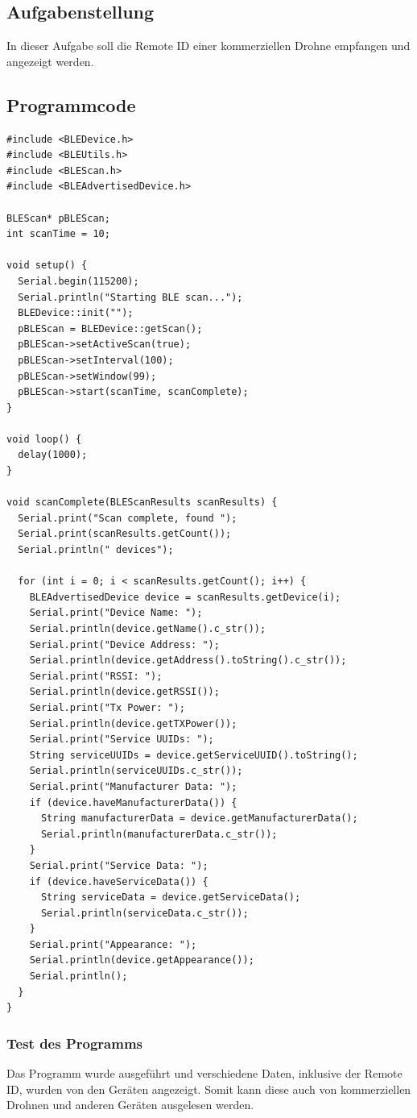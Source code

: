 \documentclass[twoside]{article}
\begin{document}
\subsection{Aufgabenstellung}
In dieser Aufgabe soll die Remote ID einer kommerziellen Drohne empfangen und angezeigt werden.

\subsection{Programmcode}
\begin{verbatim}
#include <BLEDevice.h>
#include <BLEUtils.h>
#include <BLEScan.h>
#include <BLEAdvertisedDevice.h>
 
BLEScan* pBLEScan;
int scanTime = 10;
 
void setup() {
  Serial.begin(115200);
  Serial.println("Starting BLE scan...");
  BLEDevice::init("");
  pBLEScan = BLEDevice::getScan();
  pBLEScan->setActiveScan(true);
  pBLEScan->setInterval(100);
  pBLEScan->setWindow(99);
  pBLEScan->start(scanTime, scanComplete);
}
 
void loop() {
  delay(1000);
}
 
void scanComplete(BLEScanResults scanResults) {
  Serial.print("Scan complete, found ");
  Serial.print(scanResults.getCount());
  Serial.println(" devices");
 
  for (int i = 0; i < scanResults.getCount(); i++) {
    BLEAdvertisedDevice device = scanResults.getDevice(i);
    Serial.print("Device Name: ");
    Serial.println(device.getName().c_str());
    Serial.print("Device Address: ");
    Serial.println(device.getAddress().toString().c_str());
    Serial.print("RSSI: ");
    Serial.println(device.getRSSI());
    Serial.print("Tx Power: ");
    Serial.println(device.getTXPower());
    Serial.print("Service UUIDs: ");
    String serviceUUIDs = device.getServiceUUID().toString();
    Serial.println(serviceUUIDs.c_str());
    Serial.print("Manufacturer Data: ");
    if (device.haveManufacturerData()) {
      String manufacturerData = device.getManufacturerData();
      Serial.println(manufacturerData.c_str());
    }
    Serial.print("Service Data: ");
    if (device.haveServiceData()) {
      String serviceData = device.getServiceData();
      Serial.println(serviceData.c_str());
    }
    Serial.print("Appearance: ");
    Serial.println(device.getAppearance());
    Serial.println();
  }
}
\end{verbatim}

\subsubsection{Test des Programms}
Das Programm wurde ausgeführt und verschiedene Daten, inklusive der Remote ID, wurden von den Geräten angezeigt. Somit kann diese auch von kommerziellen Drohnen und anderen Geräten ausgelesen werden.
\end{document}
